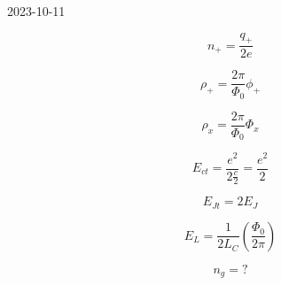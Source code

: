 


2023-10-11


\[ n_+ = \frac{q_+}{2e}  \]

\[ \rho_+  = \frac{2\pi}{\Phi_{0}} \phi_+ \]


\[ \rho_x = \frac{2\pi}{\Phi_0} \Phi_x  \]

\[ E_{ct} = \frac{e^2}{2\frac{c}{2} } = \frac{e^{2}}{2}  \]

\[ E_{Jt} = 2E_J  \]

\[ E_L = \frac{1}{2L_C} \left( \frac{\Phi_0}{2\pi}  \right)  \]

\[ n_g = ? \]





